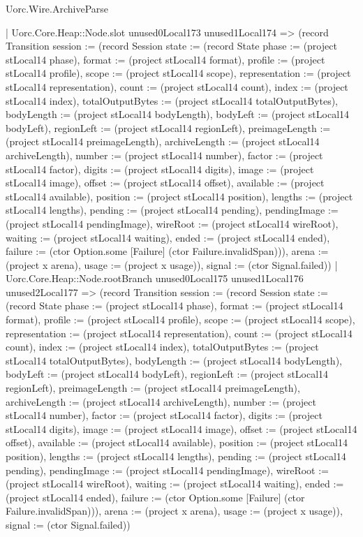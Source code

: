 \begin{lexlean}{Uorc.Wire.ArchiveParse}
\begin{semanticmodule}
{            | Uorc.Core.Heap::Node.slot unused0Local173 unused1Local174 => (record Transition {session := (record Session {state := (record State {phase := (project stLocal14 phase), format := (project stLocal14 format), profile := (project stLocal14 profile), scope := (project stLocal14 scope), representation := (project stLocal14 representation), count := (project stLocal14 count), index := (project stLocal14 index), totalOutputBytes := (project stLocal14 totalOutputBytes), bodyLength := (project stLocal14 bodyLength), bodyLeft := (project stLocal14 bodyLeft), regionLeft := (project stLocal14 regionLeft), preimageLength := (project stLocal14 preimageLength), archiveLength := (project stLocal14 archiveLength), number := (project stLocal14 number), factor := (project stLocal14 factor), digits := (project stLocal14 digits), image := (project stLocal14 image), offset := (project stLocal14 offset), available := (project stLocal14 available), position := (project stLocal14 position), lengths := (project stLocal14 lengths), pending := (project stLocal14 pending), pendingImage := (project stLocal14 pendingImage), wireRoot := (project stLocal14 wireRoot), waiting := (project stLocal14 waiting), ended := (project stLocal14 ended), failure := (ctor Option.some [Failure] (ctor Failure.invalidSpan))}), arena := (project x arena), usage := (project x usage)}), signal := (ctor Signal.failed)})
            | Uorc.Core.Heap::Node.rootBranch unused0Local175 unused1Local176 unused2Local177 => (record Transition {session := (record Session {state := (record State {phase := (project stLocal14 phase), format := (project stLocal14 format), profile := (project stLocal14 profile), scope := (project stLocal14 scope), representation := (project stLocal14 representation), count := (project stLocal14 count), index := (project stLocal14 index), totalOutputBytes := (project stLocal14 totalOutputBytes), bodyLength := (project stLocal14 bodyLength), bodyLeft := (project stLocal14 bodyLeft), regionLeft := (project stLocal14 regionLeft), preimageLength := (project stLocal14 preimageLength), archiveLength := (project stLocal14 archiveLength), number := (project stLocal14 number), factor := (project stLocal14 factor), digits := (project stLocal14 digits), image := (project stLocal14 image), offset := (project stLocal14 offset), available := (project stLocal14 available), position := (project stLocal14 position), lengths := (project stLocal14 lengths), pending := (project stLocal14 pending), pendingImage := (project stLocal14 pendingImage), wireRoot := (project stLocal14 wireRoot), waiting := (project stLocal14 waiting), ended := (project stLocal14 ended), failure := (ctor Option.some [Failure] (ctor Failure.invalidSpan))}), arena := (project x arena), usage := (project x usage)}), signal := (ctor Signal.failed)})
}
\end{semanticmodule}
\end{lexlean}
